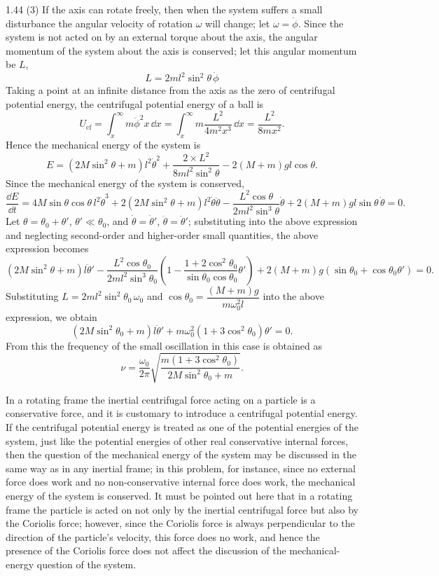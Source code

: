 \begin{solution}{1.44}
(3) If the axis can rotate freely, then when the system suffers a small disturbance the angular velocity of rotation $\omega$ will change; let $\omega=\dot\phi$. Since the system is not acted on by an external torque about the axis, the angular momentum of the system about the axis is conserved; let this angular momentum be $L$,
\begin{equation}
L=2ml^2\sin^2\theta\,\dot\phi \tag{13}
\end{equation}
Taking a point at an infinite distance from the axis as the zero of centrifugal potential energy, the centrifugal potential energy of a ball is
\[
U_{\mathrm{cf}}=\int_x^\infty m\dot\phi^2x\,\dd x=\int_x^\infty m\frac{L^2}{4m^2x^3}\,\dd x=\frac{L^2}{8mx^2}.
\]
Hence the mechanical energy of the system is
\[
E=(2M\sin^2\theta+m)l^2\dot\theta^2+\frac{2\times L^2}{8ml^2\sin^2\theta}-2(M+m)gl\cos\theta.
\]
Since the mechanical energy of the system is conserved,
\[
\frac{\dd E}{\dd t}=4M\sin\theta\cos\theta\,l^2\dot\theta^3+2(2M\sin^2\theta+m)l^2\dot\theta\ddot\theta-\frac{L^2\cos\theta}{2ml^2\sin^3\theta}\dot\theta+2(M+m)gl\sin\theta\,\dot\theta=0.
\]
Let $\theta=\theta_0+\theta'$, $\theta'\ll\theta_0$, and $\dot\theta=\dot\theta'$, $\ddot\theta=\ddot\theta'$; substituting into the above expression and neglecting second-order and higher-order small quantities, the above expression becomes
\[
(2M\sin^2\theta+m)l\ddot\theta'-\frac{L^2\cos\theta_0}{2ml^2\sin^3\theta_0}\left(1-\frac{1+2\cos^2\theta_0}{\sin\theta_0\cos\theta_0}\theta'\right)+2(M+m)g\left(\sin\theta_0+\cos\theta_0\theta'\right)=0.
\]
Substituting $L=2ml^2\sin^2\theta_0\,\omega_0$ and $\cos\theta_0=\dfrac{(M+m)g}{m\omega_0^2l}$ into the above expression, we obtain
\[
(2M\sin^2\theta_0+m)l\ddot\theta'+m\omega_0^2\left(1+3\cos^2\theta_0\right)\theta'=0.
\]
From this the frequency of the small oscillation in this case is obtained as
\[
\nu=\frac{\omega_0}{2\pi}\sqrt{\frac{m\left(1+3\cos^2\theta_0\right)}{2M\sin^2\theta_0+m}}.
\]

\begin{commentary}
In a rotating frame the inertial centrifugal force acting on a particle is a conservative force, and it is customary to introduce a centrifugal potential energy. If the centrifugal potential energy is treated as one of the potential energies of the system, just like the potential energies of other real conservative internal forces, then the question of the mechanical energy of the system may be discussed in the same way as in any inertial frame; in this problem, for instance, since no external force does work and no non-conservative internal force does work, the mechanical energy of the system is conserved. It must be pointed out here that in a rotating frame the particle is acted on not only by the inertial centrifugal force but also by the Coriolis force; however, since the Coriolis force is always perpendicular to the direction of the particle's velocity, this force does no work, and hence the presence of the Coriolis force does not affect the discussion of the mechanical-energy question of the system.
\end{commentary}
\end{solution}

